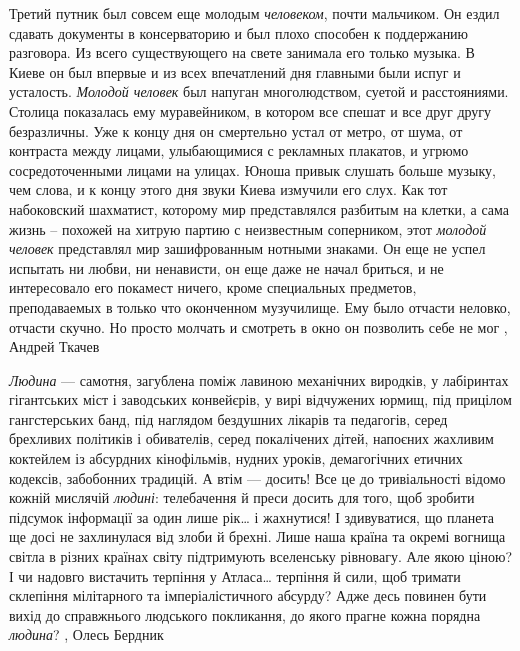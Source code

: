 Третий путник был совсем еще молодым \emph{человеком}, почти мальчиком. Он ездил
сдавать документы в консерваторию и был плохо способен к поддержанию разговора.
Из всего существующего на свете занимала его только музыка. В Киеве он был
впервые и из всех впечатлений дня главными были испуг и усталость. \emph{Молодой
человек} был напуган многолюдством, суетой и расстояниями. Столица показалась
ему муравейником, в котором все спешат и все друг другу безразличны. Уже к
концу дня он смертельно устал от метро, от шума, от контраста между лицами,
улыбающимися с рекламных плакатов, и угрюмо сосредоточенными лицами на улицах.
Юноша привык слушать больше музыку, чем слова, и к концу этого дня звуки Киева
измучили его слух.  Как тот набоковский шахматист, которому мир представлялся
разбитым на клетки, а сама жизнь – похожей на хитрую партию с неизвестным
соперником, этот \emph{молодой человек} представлял мир зашифрованным нотными знаками.
Он еще не успел испытать ни любви, ни ненависти, он еще даже не начал бриться,
и не интересовало его покамест ничего, кроме специальных предметов,
преподаваемых в только что оконченном музучилище. Ему было отчасти неловко,
отчасти скучно. Но просто молчать и смотреть в окно он позволить себе не мог
, Андрей Ткачев

\emph{Людина} — самотня, загублена поміж лавиною механічних виродків, у лабіринтах
гігантських міст і заводських конвейєрів, у вирі відчужених юрмищ, під прицілом
гангстерських банд, під наглядом бездушних лікарів та педагогів, серед
брехливих політиків і обивателів, серед покалічених дітей, напоєних жахливим
коктейлем із абсурдних кінофільмів, нудних уроків, демагогічних етичних
кодексів, забобонних традицій. А втім — досить! Все це до тривіальності відомо
кожній мислячій \emph{людині}: телебачення й преси досить для того, щоб зробити
підсумок інформації за один лише рік… і жахнутися! І здивуватися, що планета ще
досі не захлинулася від злоби й брехні. Лише наша країна та окремі вогнища
світла в різних країнах світу підтримують вселенську рівновагу. Але якою ціною?
І чи надовго вистачить терпіння у Атласа… терпіння й сили, щоб тримати
склепіння мілітарного та імперіалістичного абсурду? Адже десь повинен бути
вихід до справжнього людського покликання, до якого прагне кожна порядна
\emph{людина}?
, Олесь Бердник


